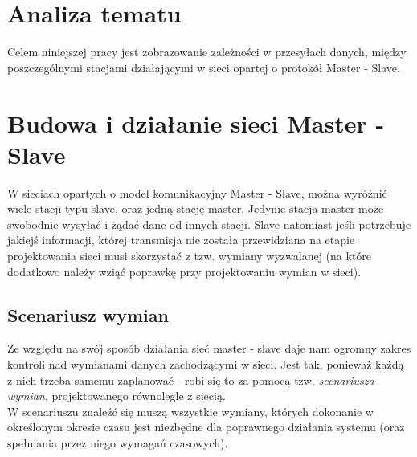 \section{Analiza tematu}
Celem niniejszej pracy jest zobrazowanie zależności w przesyłach danych, między poszczególnymi stacjami działającymi w sieci opartej o protokół Master - Slave.

\section{Budowa i działanie sieci Master - Slave}
W sieciach opartych o model komunikacyjny Master - Slave, można wyróżnić wiele stacji typu slave, oraz jedną stację master. Jedynie stacja master może swobodnie wysyłać i żądać dane od innych stacji. Slave natomiast jeśli potrzebuje jakiejś informacji, której transmisja nie została przewidziana na etapie projektowania sieci musi skorzystać z tzw. wymiany wyzwalanej (na które dodatkowo należy wziąć poprawkę przy projektowaniu wymian w sieci).
	\subsection{Scenariusz wymian}
	Ze względu na swój sposób działania sieć master - slave daje nam ogromny zakres kontroli nad wymianami danych zachodzącymi w sieci. Jest tak, ponieważ każdą z nich trzeba samemu zaplanować - robi się to za pomocą tzw. \textit{scenariusza wymian}, projektowanego równolegle z siecią.\\
	W scenariuszu znaleźć się muszą wszystkie wymiany, których dokonanie w określonym okresie czasu jest niezbędne dla poprawnego działania systemu (oraz spełniania przez niego wymagań czasowych).